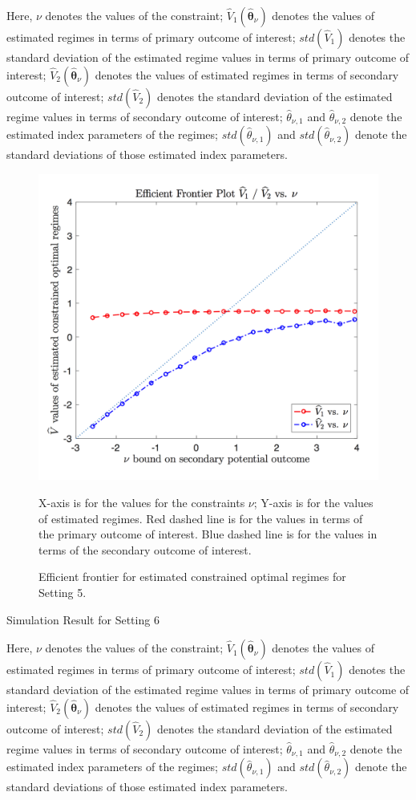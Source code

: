 \documentclass{article}
\newcommand{\wh}{\widehat}
\newcommand{\bs}{ \boldsymbol}
\begin{document}
\begin{appendices}
\begin{table}[!htbp]
	Here, $\nu$ denotes the values of the constraint; $\wh{V}_1(\wh{\bs{\theta}}_{\nu})$ denotes the values of estimated regimes in terms of primary outcome of interest; $std(\wh{V}_1)$ denotes the standard deviation of the estimated regime values in terms of primary outcome of interest; $\wh{V}_2(\wh{\bs{\theta}}_{\nu})$ denotes the values of estimated regimes in terms of secondary outcome of interest; $std(\wh{V}_2)$ denotes the standard deviation of the estimated regime values in terms of secondary outcome of interest; $\wh{\theta}_{\nu,1}$ and $\wh{\theta}_{\nu,2}$ denote the estimated index parameters of the regimes; $std(\wh{\theta}_{\nu,1})$ and $std(\wh{\theta}_{\nu,2})$ denote the standard deviations of those estimated index parameters.	
\end{table} 
\begin{figure}[!htb]
	\centering
	\includegraphics[width=.9\linewidth]{./figs/efficient_plot5.png}
	\caption{Efficient frontier for estimated constrained optimal regimes for Setting 5.}
	\label{fig:5}
	\justify
X-axis is for the values for the constraints $\nu$; Y-axis is for the values of estimated regimes. Red dashed line is for the values in terms of the primary outcome of interest. Blue dashed line is for the values in terms of the secondary outcome of interest.
\end{figure}
\begin{table}[!htbp]
	\caption {Simulation Result for Setting 6}
	\centering
	{\tt
		
	}
	\justify
	Here, $\nu$ denotes the values of the constraint; $\wh{V}_1(\wh{\bs{\theta}}_{\nu})$ denotes the values of estimated regimes in terms of primary outcome of interest; $std(\wh{V}_1)$ denotes the standard deviation of the estimated regime values in terms of primary outcome of interest; $\wh{V}_2(\wh{\bs{\theta}}_{\nu})$ denotes the values of estimated regimes in terms of secondary outcome of interest; $std(\wh{V}_2)$ denotes the standard deviation of the estimated regime values in terms of secondary outcome of interest; $\wh{\theta}_{\nu,1}$ and $\wh{\theta}_{\nu,2}$ denote the estimated index parameters of the regimes; $std(\wh{\theta}_{\nu,1})$ and $std(\wh{\theta}_{\nu,2})$ denote the standard deviations of those estimated index parameters.	

\end{table}
\end{appendices}
\end{document}
